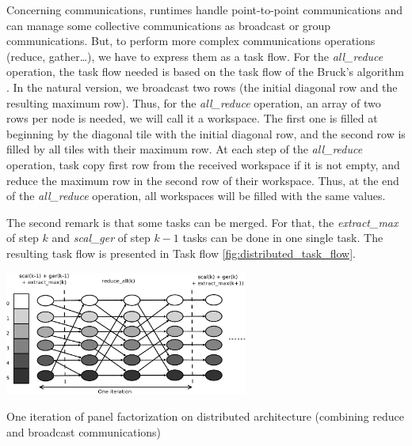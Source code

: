 Concerning communications, runtimes handle point-to-point communications and can manage some collective communications as broadcast or group communications. But, to perform more complex communications operations (reduce, gather\dots), we have to express them as a task flow. For the \emph{all\_reduce} operation, the task flow needed is based on the task flow of the Bruck's algorithm \cite{BruckEtAl97}.
In the natural version, we broadcast two rows (the initial diagonal row and the resulting maximum row). Thus, for the \emph{all\_reduce} operation, an array of two rows per node is needed, we will call it a workspace. The first one is filled at beginning by the diagonal tile with the initial diagonal row, and the second row is filled by all tiles with their maximum row. At each step of the \textit{all\_reduce} operation, task copy first row from the received workspace if it is not empty, and reduce the maximum row in the second row of their workspace. Thus, at the end of the \textit{all\_reduce} operation, all workspaces will be filled with the same values.

The second remark is that some tasks can be merged. For that, the \emph{extract\_max} of step $k$ and \emph{scal\_ger} of step $k-1$ tasks can be done in one single task.
The resulting task flow is presented in Task flow \ref{fig:distributed_task_flow}.

\begin{taskflow}[!ht]
\centering
\includegraphics[width=0.6\textwidth]{figures/distributed_tf_bw.pdf}
\caption{One iteration of panel factorization on distributed architecture (combining reduce and broadcast communications)\label{fig:distributed_task_flow}}

\end{taskflow}

